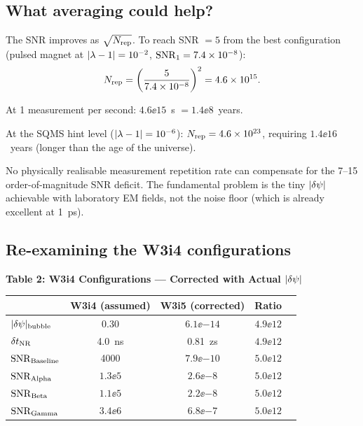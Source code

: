\subsection{What averaging could help?}
\label{ssec:averaging}

The SNR improves as $\sqrt{N_{\rm rep}}$. To reach SNR $= 5$ from the best
configuration (pulsed magnet at $|\lambda - 1| = 10^{-2}$, $\mathrm{SNR}_1 = 7.4\times 10^{-8}$):
\begin{equation}
N_{\rm rep} = \left(\frac{5}{7.4\times 10^{-8}}\right)^2 = 4.6\times 10^{15}.
\label{eq:reps_needed}
\end{equation}

At 1 measurement per second: $4.6\ee{15}$~s $= 1.4\ee{8}$~years.

At the SQMS hint level ($|\lambda - 1| = 10^{-6}$): $N_{\rm rep} = 4.6\times 10^{23}$,
requiring $1.4\ee{16}$~years (longer than the age of the universe).

\begin{finding}
\label{find:averaging_fails}
No physically realisable measurement repetition rate can compensate for the
7--15 order-of-magnitude SNR deficit. The fundamental problem is the tiny
$|\delta\psi|$ achievable with laboratory EM fields, not the noise floor
(which is already excellent at 1~ps).
\end{finding}

\subsection{Re-examining the W3i4 configurations}
\label{ssec:configs_corrected}

\begin{center}
\textbf{Table 2: W3i4 Configurations --- Corrected with Actual $|\delta\psi|$}
\vspace{0.5em}

\begin{tabular}{@{}lcccc@{}}
\toprule
& \textbf{W3i4 (assumed)} & \textbf{W3i5 (corrected)} & \textbf{Ratio} \\
\midrule
$|\delta\psi|_{\rm bubble}$ & 0.30 & $6.1\ee{-14}$ & $4.9\ee{12}$ \\
$\delta t_{\rm NR}$ & 4.0~ns & 0.81~zs & $4.9\ee{12}$ \\
$\mathrm{SNR}_{\rm Baseline}$ & 4000 & $7.9\ee{-10}$ & $5.0\ee{12}$ \\
$\mathrm{SNR}_{\rm Alpha}$ & $1.3\ee{5}$ & $2.6\ee{-8}$ & $5.0\ee{12}$ \\
$\mathrm{SNR}_{\rm Beta}$ & $1.1\ee{5}$ & $2.2\ee{-8}$ & $5.0\ee{12}$ \\
$\mathrm{SNR}_{\rm Gamma}$ & $3.4\ee{6}$ & $6.8\ee{-7}$ & $5.0\ee{12}$ \\
\bottomrule
\end{tabular}
\end{center}

